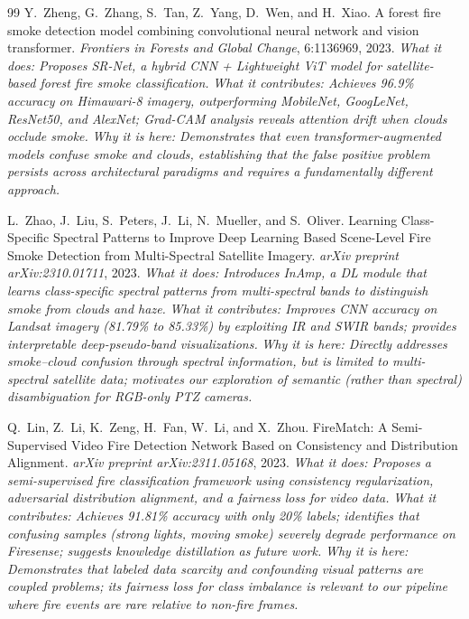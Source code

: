 \documentclass[11pt,twocolumn]{article}
\begin{document}
\begin{thebibliography}{99}
Y.~Zheng, G.~Zhang, S.~Tan, Z.~Yang, D.~Wen, and H.~Xiao.
\newblock A forest fire smoke detection model combining convolutional neural network and vision transformer.
\newblock \textit{Frontiers in Forests and Global Change}, 6:1136969, 2023.
\newblock \textit{What it does: Proposes SR-Net, a hybrid CNN + Lightweight ViT model for satellite-based forest fire smoke classification.}
\newblock \textit{What it contributes: Achieves 96.9\% accuracy on Himawari-8 imagery, outperforming MobileNet, GoogLeNet, ResNet50, and AlexNet; Grad-CAM analysis reveals attention drift when clouds occlude smoke.}
\newblock \textit{Why it is here: Demonstrates that even transformer-augmented models confuse smoke and clouds, establishing that the false positive problem persists across architectural paradigms and requires a fundamentally different approach.}

L.~Zhao, J.~Liu, S.~Peters, J.~Li, N.~Mueller, and S.~Oliver.
\newblock Learning Class-Specific Spectral Patterns to Improve Deep Learning Based Scene-Level Fire Smoke Detection from Multi-Spectral Satellite Imagery.
\newblock \textit{arXiv preprint arXiv:2310.01711}, 2023.
\newblock \textit{What it does: Introduces InAmp, a DL module that learns class-specific spectral patterns from multi-spectral bands to distinguish smoke from clouds and haze.}
\newblock \textit{What it contributes: Improves CNN accuracy on Landsat imagery (81.79\% to 85.33\%) by exploiting IR and SWIR bands; provides interpretable deep-pseudo-band visualizations.}
\newblock \textit{Why it is here: Directly addresses smoke--cloud confusion through spectral information, but is limited to multi-spectral satellite data; motivates our exploration of semantic (rather than spectral) disambiguation for RGB-only PTZ cameras.}

Q.~Lin, Z.~Li, K.~Zeng, H.~Fan, W.~Li, and X.~Zhou.
\newblock FireMatch: A Semi-Supervised Video Fire Detection Network Based on Consistency and Distribution Alignment.
\newblock \textit{arXiv preprint arXiv:2311.05168}, 2023.
\newblock \textit{What it does: Proposes a semi-supervised fire classification framework using consistency regularization, adversarial distribution alignment, and a fairness loss for video data.}
\newblock \textit{What it contributes: Achieves 91.81\% accuracy with only 20\% labels; identifies that confusing samples (strong lights, moving smoke) severely degrade performance on Firesense; suggests knowledge distillation as future work.}
\newblock \textit{Why it is here: Demonstrates that labeled data scarcity and confounding visual patterns are coupled problems; its fairness loss for class imbalance is relevant to our pipeline where fire events are rare relative to non-fire frames.}


\end{thebibliography}
\end{document}

